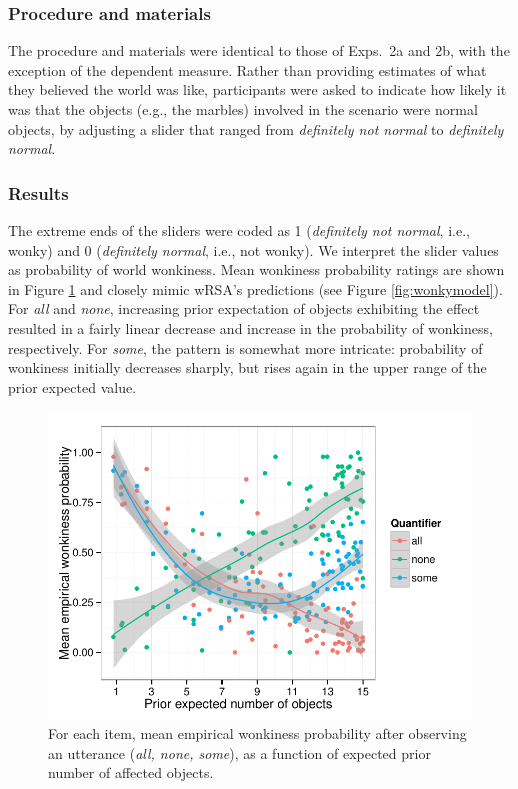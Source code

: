 \documentclass[10pt,letterpaper]{article}
\newcommand{\figref}[1]{Figure \ref{#1}}
\begin{document}
\subsubsection{Procedure and materials}

The procedure and materials were identical to those of Exps.~2a and 2b, with the exception of the dependent measure. Rather than providing estimates of what they believed the world was like, participants were asked to indicate how likely it was that the objects  (e.g., the marbles) involved in the scenario were normal objects, by adjusting a slider that ranged from \emph{definitely not normal} to \emph{definitely normal}.

\subsubsection{Results}

The extreme ends of the sliders were coded as 1 (\emph{definitely not normal}, i.e., wonky) and 0 (\emph{definitely normal}, i.e., not wonky). We interpret the slider values as probability of world wonkiness. Mean wonkiness probability ratings are shown in \figref{fig:wonkyratings} and closely mimic wRSA's predictions (see \figref{fig:wonkymodel}). For \emph{all} and \emph{none}, increasing prior expectation of objects exhibiting the effect resulted in a fairly linear decrease and increase in the probability of wonkiness, respectively. For \emph{some}, the pattern is somewhat more intricate: probability of wonkiness initially decreases sharply, but rises again in the upper range of the prior expected value. 

\begin{figure}
	\includegraphics[width=.5\textwidth]{pics/empirical-wonkiness}
	\caption{For each item, mean empirical wonkiness probability after observing an utterance (\emph{all, none, some}), as a function of expected prior number of affected objects.}
	\label{fig:wonkyratings}	
\end{figure}
\end{document}
